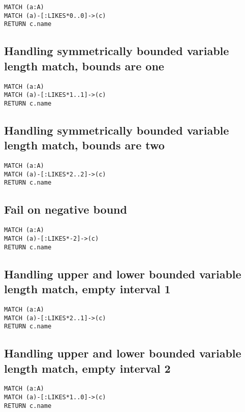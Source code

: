 \begin{lstlisting}
MATCH (a:A)
MATCH (a)-[:LIKES*0..0]->(c)
RETURN c.name
\end{lstlisting}

\subsection{Handling symmetrically bounded variable length match, bounds are one}

\begin{lstlisting}
MATCH (a:A)
MATCH (a)-[:LIKES*1..1]->(c)
RETURN c.name
\end{lstlisting}

\subsection{Handling symmetrically bounded variable length match, bounds are two}

\begin{lstlisting}
MATCH (a:A)
MATCH (a)-[:LIKES*2..2]->(c)
RETURN c.name
\end{lstlisting}

\subsection{Fail on negative bound}

\begin{lstlisting}
MATCH (a:A)
MATCH (a)-[:LIKES*-2]->(c)
RETURN c.name
\end{lstlisting}

\subsection{Handling upper and lower bounded variable length match, empty interval 1}

\begin{lstlisting}
MATCH (a:A)
MATCH (a)-[:LIKES*2..1]->(c)
RETURN c.name
\end{lstlisting}

\subsection{Handling upper and lower bounded variable length match, empty interval 2}

\begin{lstlisting}
MATCH (a:A)
MATCH (a)-[:LIKES*1..0]->(c)
RETURN c.name
\end{lstlisting}

